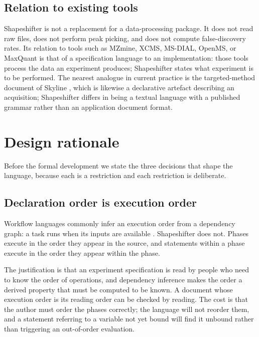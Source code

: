 \documentclass[11pt,twocolumn,a4paper]{article}
\theoremstyle{ssthm}
\theoremstyle{definition}
\theoremstyle{remark}
\begin{document}
\subsection{Relation to existing tools}

Shapeshifter is not a replacement for a data-processing package. It does
not read raw files, does not perform peak picking, and does not compute
false-discovery rates. Its relation to tools such as MZmine, XCMS,
MS-DIAL, OpenMS, or MaxQuant
\citep{pluskal2010mzmine,smith2006xcms,tsugawa2015msdial,%
rost2016openms,cox2008maxquant} is that of a specification language to an
implementation: those tools process the data an experiment produces;
Shapeshifter states what experiment is to be performed. The nearest
analogue in current practice is the targeted-method document of Skyline
\citep{maclean2010skyline}, which is likewise a declarative artefact
describing an acquisition; Shapeshifter differs in being a textual
language with a published grammar rather than an application document
format.

\section{Design rationale}
\label{sec:design}

Before the formal development we state the three decisions that shape the
language, because each is a restriction and each restriction is
deliberate.

\subsection{Declaration order is execution order}

Workflow languages commonly infer an execution order from a dependency
graph: a task runs when its inputs are available
\citep{koster2012snakemake,ditommaso2017nextflow}. Shapeshifter does not.
Phases execute in the order they appear in the source, and statements
within a phase execute in the order they appear within the phase.

The justification is that an experiment specification is read by people
who need to know the order of operations, and dependency inference makes
the order a derived property that must be computed to be known. A
document whose execution order is its reading order can be checked by
reading. The cost is that the author must order the phases correctly;
the language will not reorder them, and a statement referring to a
variable not yet bound will find it unbound rather than triggering
an out-of-order evaluation.
\end{document}
